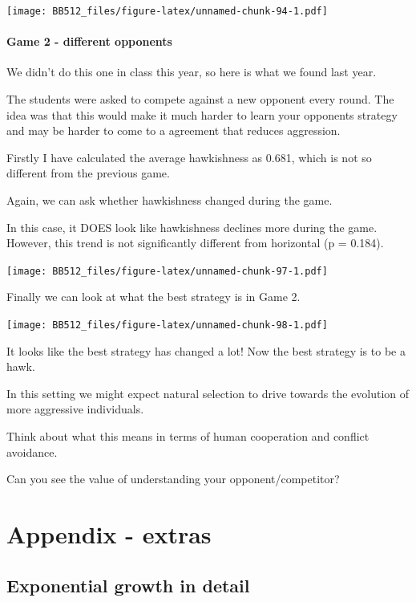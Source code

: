 \documentclass[
  a4paper]{book}
\begin{document}
\texttt{[image: BB512\_files/figure-latex/unnamed-chunk-94-1.pdf]}

\hypertarget{game-2---different-opponents}{%
\subsection{Game 2 - different opponents}\label{game-2---different-opponents}}

We didn't do this one in class this year, so here is what we found last year.

The students were asked to compete against a new opponent every round. The idea was that this would make it much harder to learn your opponents strategy and may be harder to come to a agreement that reduces aggression.

Firstly I have calculated the average hawkishness as 0.681, which is not so different from the previous game.

Again, we can ask whether hawkishness changed during the game.

In this case, it DOES look like hawkishness declines more during the game. However, this trend is not significantly different from horizontal (p = 0.184).

\texttt{[image: BB512\_files/figure-latex/unnamed-chunk-97-1.pdf]}

Finally we can look at what the best strategy is in Game 2.

\texttt{[image: BB512\_files/figure-latex/unnamed-chunk-98-1.pdf]}

It looks like the best strategy has changed a lot! Now the best strategy is to be a hawk.

In this setting we might expect natural selection to drive towards the evolution of more aggressive individuals.

Think about what this means in terms of human cooperation and conflict avoidance.

Can you see the value of understanding your opponent/competitor?

\hypertarget{part-appendix---extras}{%
\part{Appendix - extras}\label{part-appendix---extras}}

\hypertarget{exponential-growth-in-detail}{%
\chapter{Exponential growth in detail}\label{exponential-growth-in-detail}}
\end{document}
